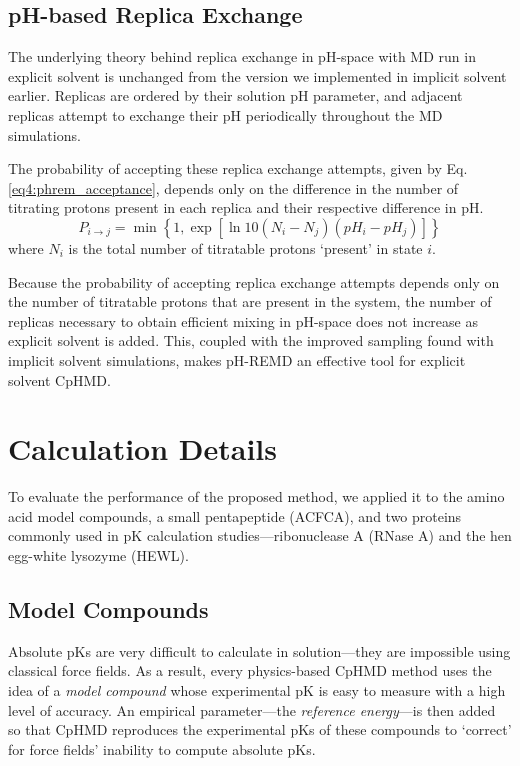 \subsection{pH-based Replica Exchange}

The underlying theory behind replica exchange in pH-space with MD run in
explicit solvent is unchanged from the version we implemented in implicit
solvent earlier. \cite{Swails_JChemTheoryComput_2012_v8_p4393,
Itoh_Proteins_2011_v79_p3420} Replicas are ordered by their solution pH
parameter, and adjacent replicas attempt to exchange their pH periodically
throughout the MD simulations.

The probability of accepting these replica exchange attempts, given by
Eq. \ref{eq4:phrem_acceptance}, depends only on the difference in the number of
titrating protons present in each replica and their respective difference in pH.
\cite{Swails_JChemTheoryComput_2012_v8_p4393}
\begin{equation}
   P_{i \rightarrow j} = \min \left \lbrace 1, \exp \left [ \ln 10 (N_i - N_j)
   (pH_i - pH_j) \right ] \right \rbrace
   \label{eq4:phrem_acceptance}
\end{equation}
where $N_i$ is the total number of titratable protons `present' in state $i$.

Because the probability of accepting replica exchange attempts depends only on
the number of titratable protons that are present in the system, the number of
replicas necessary to obtain efficient mixing in pH-space does not increase as
explicit solvent is added. This, coupled with the improved sampling found with
implicit solvent simulations, \cite{Swails_JChemTheoryComput_2012_v8_p4393}
makes pH-REMD an effective tool for explicit solvent CpHMD.

\section{Calculation Details}

To evaluate the performance of the proposed method, we applied it to the amino
acid model compounds, a small pentapeptide (ACFCA), and two proteins commonly
used in pK calculation studies---ribonuclease A (RNase A) and the hen
egg-white lysozyme (HEWL).

\subsection{Model Compounds}

Absolute pKs are very difficult to calculate in solution---they are
impossible using classical force fields. As a result, every physics-based CpHMD
method uses the idea of a \emph{model compound} whose experimental pK is
easy to measure with a high level of accuracy. An empirical parameter---the
\emph{reference energy}---is then added so that CpHMD reproduces the
experimental pKs of these compounds to `correct' for force fields'
inability to compute absolute pKs.

